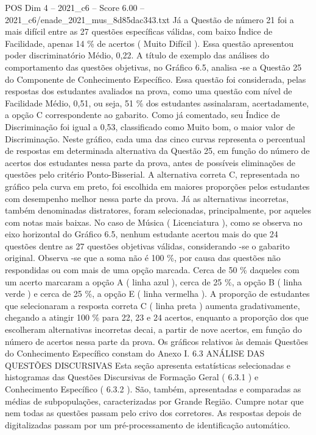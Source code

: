 \begin{textsample}{POS Dim 4 – 2021\_c6 – Score 6.00 – 2021\_c6/enade\_2021\_mus\_8d85dac343.txt}
Já a Questão de número 21 foi a mais difícil entre as 27 questões específicas válidas, com baixo Índice de Facilidade, apenas 14 \% de acertos ( Muito Difícil ).
Essa questão apresentou poder discriminatório Médio, 0,22.
A título de exemplo das análises do comportamento das questões objetivas, no Gráfico 6.5, analisa -se a Questão 25 do Componente de Conhecimento Específico.
Essa questão foi considerada, pelas respostas dos estudantes avaliados na prova, como uma questão com nível de Facilidade Médio, 0,51, ou seja, 51 \% dos estudantes assinalaram, acertadamente, a opção C correspondente ao gabarito.
Como já comentado, seu Índice de Discriminação foi igual a 0,53, classificado como Muito bom, o maior valor de Discriminação.
Neste gráfico, cada uma das cinco curvas representa o percentual de respostas em determinada alternativa da Questão 25, em função do número de acertos dos estudantes nessa parte da prova, antes de possíveis eliminações de questões pelo critério Ponto-Bisserial.
A alternativa correta C, representada no gráfico pela curva em preto, foi escolhida em maiores proporções pelos estudantes com desempenho melhor nessa parte da prova.
Já as alternativas incorretas, também denominadas distratores, foram selecionadas, principalmente, por aqueles com notas mais baixas.
No caso de Música ( Licenciatura ), como se observa no eixo horizontal do Gráfico 6.5, nenhum estudante acertou mais do que 24 questões dentre as 27 questões objetivas válidas, considerando -se o gabarito original.
Observa -se que a soma não é 100 \%, por causa das questões não respondidas ou com mais de uma opção marcada.
Cerca de 50 \% daqueles com um acerto marcaram a opção A ( linha azul ), cerca de 25 \%, a opção B ( linha verde ) e cerca de 25 \%, a opção E ( linha vermelha ).
A proporção de estudantes que selecionaram a resposta correta C ( linha preta ) aumenta gradativamente, chegando a atingir 100 \% para 22, 23 e 24 acertos, enquanto a proporção dos que escolheram alternativas incorretas decai, a partir de nove acertos, em função do número de acertos nessa parte da prova.
Os gráficos relativos às demais Questões do Conhecimento Específico constam do Anexo I. 6.3 ANÁLISE DAS QUESTÕES DISCURSIVAS Esta seção apresenta estatísticas selecionadas e histogramas das Questões Discursivas de Formação Geral ( 6.3.1 ) e Conhecimento Específico ( 6.3.2 ).
São, também, apresentadas e comparadas as médias de subpopulações, caracterizadas por Grande Região.
Cumpre notar que nem todas as questões passam pelo crivo dos corretores.
As respostas depois de digitalizadas passam por um pré-processamento de identificação automático.

\end{textsample}
